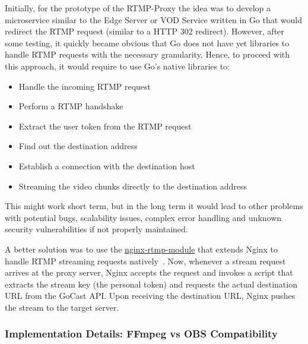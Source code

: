 Initially, for the prototype of the RTMP-Proxy the idea was to develop a microservice similar to the Edge Server or VOD Service written in Go that would redirect the \ac{RTMP} request (similar to a HTTP 302 redirect). However, after some testing, it quickly became obvious that Go does not have yet libraries to handle \ac{RTMP} requests with the necessary granularity. Hence, to proceed with this approach, it would require to use Go's native libraries to: 
\begin{itemize}
\item Handle the incoming \ac{RTMP} request
\item Perform a \ac{RTMP} handshake
\item Extract the user token from the \ac{RTMP} request
\item Find out the destination address
\item Establish a connection with the destination host
\item Streaming the video chunks directly to the destination address
\end{itemize}

\noindent This might work short term, but in the long term it would lead to other problems with potential bugs, scalability issues, complex error handling and unknown security vulnerabilities if not properly maintained.

A better solution was to use the \href{https://github.com/arut/nginx-rtmp-module}{nginx-rtmp-module}\footnotemark[7] that extends Nginx to handle \ac{RTMP} streaming requests natively~\parencite{nginx_rtmp_module}. 
Now, whenever a stream request arrives at the proxy server, Nginx accepts the request and invokes a script that extracts the stream key (the personal token) and requests the actual destination URL from the GoCast \ac{API}. Upon receiving the destination URL, Nginx pushes the stream to the target server.

\subsubsection{Implementation Details: FFmpeg vs OBS Compatibility}

